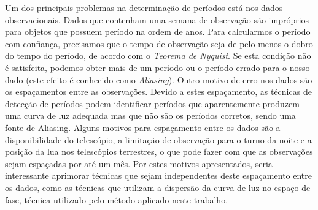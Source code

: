 Um dos principais problemas na determinação de períodos está nos dados observacionais. Dados que contenham uma semana de observação são impróprios para objetos que possuem período na ordem de anos. Para calcularmos o período com confiança, precisamos que o tempo de observação seja de pelo menos o dobro do tempo do período, de acordo com o \textit{Teorema de Nyquist}. Se esta condição não é satisfeita, podemos obter mais de um período ou o período errado para o nosso dado (este efeito é conhecido como \textit{Aliasing}). Outro motivo de erro nos dados são os espaçamentos entre as observações. Devido a estes espaçamento, as técnicas de detecção de períodos podem identificar períodos que aparentemente produzem uma curva de luz adequada mas que não são os períodos corretos, sendo uma fonte de Aliasing. Alguns motivos para espaçamento entre os dados são a disponibilidade do telescópio, a limitação de observação para o turno da noite e a posição da lua nos telescópios terrestres, o que pode fazer com que as observações sejam espaçadas por até um mês. Por estes motivos apresentados, seria interessante aprimorar técnicas que sejam independentes deste espaçamento entre os dados, como as técnicas que utilizam a dispersão da curva de luz no espaço de fase, técnica utilizado pelo método aplicado neste trabalho.
